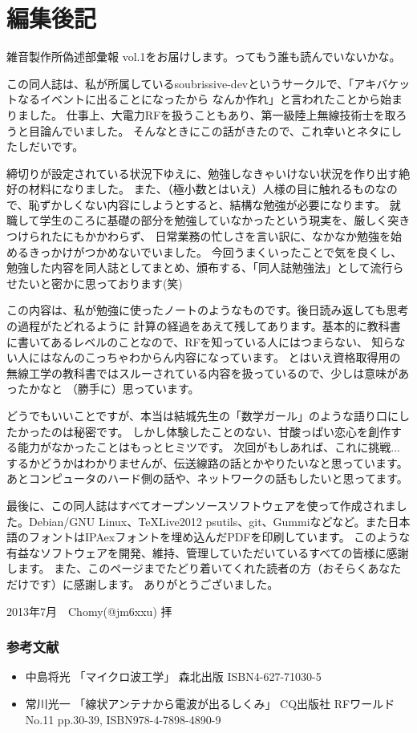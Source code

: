 \chapter*{編集後記}
雑音製作所偽述部彙報 vol.1をお届けします。ってもう誰も読んでいないかな。

この同人誌は、私が所属しているsoubrissive-devというサークルで、「アキバケットなるイベントに出ることになったから
なんか作れ」と言われたことから始まりました。
仕事上、大電力RFを扱うこともあり、第一級陸上無線技術士を取ろうと目論んでいました。
そんなときにこの話がきたので、これ幸いとネタにしたしだいです。

締切りが設定されている状況下ゆえに、勉強しなきゃいけない状況を作り出す絶好の材料になりました。
また、（極小数とはいえ）人様の目に触れるものなので、恥ずかしくない内容にしようとすると、結構な勉強が必要になります。
就職して学生のころに基礎の部分を勉強していなかったという現実を、厳しく突きつけられたにもかかわらず、
日常業務の忙しさを言い訳に、なかなか勉強を始めるきっかけがつかめないでいました。
今回うまくいったことで気を良くし、勉強した内容を同人誌としてまとめ、頒布する、「同人誌勉強法」として流行らせたいと密かに思っております(笑)

この内容は、私が勉強に使ったノートのようなものです。後日読み返しても思考の過程がたどれるように
計算の経過をあえて残してあります。基本的に教科書に書いてあるレベルのことなので、RFを知っている人にはつまらない、
知らない人にはなんのこっちゃわからん内容になっています。
とはいえ資格取得用の無線工学の教科書ではスルーされている内容を扱っているので、少しは意味があったかなと
（勝手に）思っています。

どうでもいいことですが、本当は結城先生の「数学ガール」のような語り口にしたかったのは秘密です。
しかし体験したことのない、甘酸っぱい恋心を創作する能力がなかったことはもっとヒミツです。
次回がもしあれば、これに挑戦...するかどうかはわかりませんが、伝送線路の話とかやりたいなと思っています。
あとコンピュータのハード側の話や、ネットワークの話もしたいと思ってます。

最後に、この同人誌はすべてオープンソースソフトウェアを使って作成されました。Debian/GNU Linux、\TeX Live2012
psutils、git、Gummiなどなど。また日本語のフォントはIPAexフォントを埋め込んだPDFを印刷しています。
このような有益なソフトウェアを開発、維持、管理していただいているすべての皆様に感謝します。
また、このページまでたどり着いてくれた読者の方（おそらくあなただけです）に感謝します。
ありがとうございました。

\begin{flushright}
2013年7月　Chomy(@jm6xxu) 拝
\end{flushright}

\subsection*{参考文献}
\begin{itemize}
  \item 中島将光
    「マイクロ波工学」 森北出版 ISBN4-627-71030-5
  \item 常川光一
    「線状アンテナから電波が出るしくみ」 CQ出版社 RFワールド No.11 pp.30-39, ISBN978-4-7898-4890-9
\end{itemize}